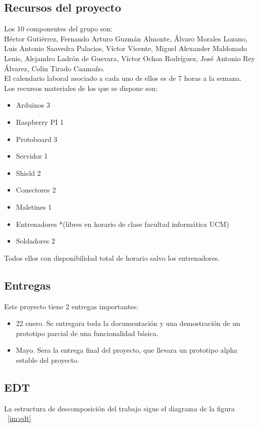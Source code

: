 \subsection{Recursos del proyecto}
Los 10 componentes del grupo son: \\

Héctor Gutiérrez, Fernando Arturo Guzmán Almonte, Álvaro Morales Lozano, Luis Antonio Saavedra Palacios, Víctor Vicente, Miguel Alexander Maldonado Lenis, Alejandro Ladrón de Guevara, Víctor Ochoa Rodríguez, José Antonio Rey Álvarez, Colin Tirado Caamaño.\\

El calendario laboral asociado a cada uno de ellos es de 7 horas a la semana.\\
Los recursos materiales de los que se dispone son:
\begin{itemize}
\item	Arduinos	3
\item	Raspberry PI	1
\item	Protoboard	3
\item	Servidor	1
\item	Shield		2
\item	Conectores	2
\item	Maletines	1
\item	Entrenadores	*(libres en horario de clase facultad informática UCM)
\item	Soldadores	2
\end{itemize}
Todos ellos con disponibilidad total de horario salvo los entrenadores.

\subsection{Entregas}
Este proyecto tiene 2 entregas importantes:
\begin{itemize}
\item	22 enero. Se entregara toda la documentación y una demostración de un prototipo parcial de una funcionalidad básica.
\item	Mayo. Sera la entrega final del proyecto, que llevara un prototipo alpha estable del proyecto.
\end{itemize}

\subsection{EDT}
La estructura de descomposición del trabajo sigue el diagrama de la figura ~\ref{im:edt}

